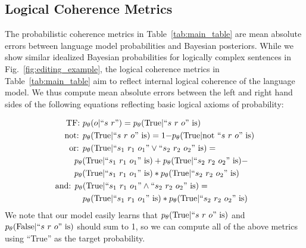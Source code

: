 \documentclass[11pt,a4paper]{article}
\begin{document}
\subsection{Logical Coherence Metrics}

The probabilistic coherence metrics in Table~\ref{tab:main_table} are mean absolute errors between language model probabilities and Bayesian posteriors. While we show similar idealized Bayesian probabilities for logically complex sentences in Fig.~\ref{fig:editing_example}, the logical coherence metrics in Table~\ref{tab:main_table} aim to reflect internal logical coherence of the language model. We thus compute mean absolute errors between the left and right hand sides of the following equations reflecting basic logical axioms of probability:

{\small
\begin{align*}
    \textrm{TF: }&p_\theta(o|``s \ r") = p_\theta(\textrm{True}|``s \ r \ o" \textrm{ is}) \\
    \textrm{not: }&p_\theta(\textrm{True}|``s \ r \ o" \textrm{ is}) = 1{-} p_\theta(\textrm{True}|\textrm{not }``s \ r \ o" \textrm{ is}) \\
    \textrm{or: }&p_\theta(\textrm{True}|``s_1 \ r_1 \ o_1" \lor ``s_2 \ r_2 \ o_2" \textrm{ is}) = \\&\hspace{-10pt}p_\theta(\textrm{True}|``s_1 \ r_1 \ o_1" \textrm{ is}) + p_\theta(\textrm{True}|``s_2 \ r_2 \ o_2" \textrm{ is}) - \\
    &\hspace{-10pt}p_\theta(\textrm{True}|``s_1 \ r_1 \ o_1" \textrm{ is}) * p_\theta(\textrm{True}|``s_2 \ r_2 \ o_2" \textrm{ is}) \\
    \textrm{and: }p_\theta&(\textrm{True}|``s_1 \ r_1 \ o_1" \land ``s_2 \ r_2 \ o_2" \textrm{ is}) = \\
    &p_\theta(\textrm{True}|``s_1 \ r_1 \ o_1" \textrm{ is}) * p_\theta(\textrm{True}|``s_2 \ r_2 \ o_2" \textrm{ is}) \\
\end{align*}
}
We note that our model easily learns that $p_\theta(\textrm{True}|``s \ r \ o" \textrm{ is})$ and $p_\theta(\textrm{False}|``s \ r \ o" \textrm{ is})$ should sum to 1, so we can compute all of the above metrics using ``True'' as the target probability. 
\end{document}
